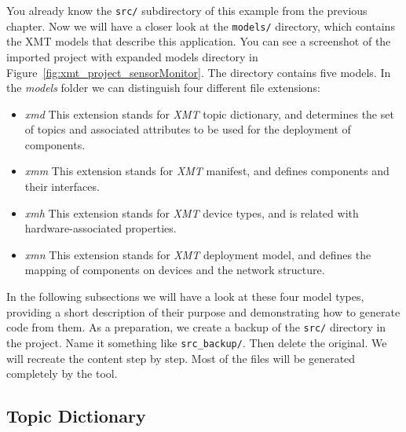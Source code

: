 You already know the \verb|src/| subdirectory of this example from the previous chapter.
Now we will have a closer look at the \verb|models/| directory, which contains the XMT models that describe this application.
You can see a screenshot of the imported project with expanded models directory in Figure~\ref{fig:xmt_project_sensorMonitor}.
The directory contains five models. 
In the \emph{models} folder we can distinguish four different file extensions:

\begin{itemize}
	\item \emph{xmd} This extension stands for \emph{XMT} topic dictionary, and determines the set of topics and associated attributes to be used for the deployment of components. 
	\item \emph{xmm} This extension stands for \emph{XMT} manifest, and defines components and their interfaces. 
	\item \emph{xmh} This extension stands for \emph{XMT} device types, and is related with hardware-associated properties. 
	\item \emph{xmn} This extension stands for \emph{XMT} deployment model, and defines the mapping of components on devices and the network structure. 
\end{itemize}

In the following subsections we will have a look at these four model types, providing a short description of their purpose and demonstrating how to generate code from them.
As a preparation, we create a backup of the \verb|src/| directory in the project.
Name it something like \verb|src_backup/|. Then delete the original.
We will recreate the content step by step.
Most of the files will be generated completely by the tool.

\subsection{Topic Dictionary}


